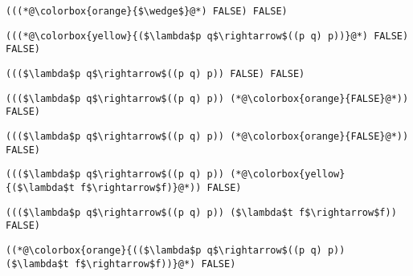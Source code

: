 \documentclass{beamer}
\begin{document}
\begin{frame}[fragile]{\CurrentSection}
\lstset{basicstyle=\ttfamily\small}\lstset{numbers=none}\lstset{language=ML}\begin{lstlisting}
(((*@\colorbox{orange}{$\wedge$}@*) FALSE) FALSE)
\end{lstlisting}
\pause\lstset{language=ML}\begin{lstlisting}
(((*@\colorbox{yellow}{($\lambda$p q$\rightarrow$((p q) p))}@*) FALSE) FALSE)
\end{lstlisting}

\end{frame}

\begin{frame}[fragile]{\CurrentSection}
\lstset{basicstyle=\ttfamily\small}\lstset{numbers=none}\lstset{language=ML}\begin{lstlisting}
((($\lambda$p q$\rightarrow$((p q) p)) FALSE) FALSE)
\end{lstlisting}
\pause\lstset{language=ML}\begin{lstlisting}
((($\lambda$p q$\rightarrow$((p q) p)) (*@\colorbox{orange}{FALSE}@*)) FALSE)
\end{lstlisting}

\end{frame}

\begin{frame}[fragile]{\CurrentSection}
\lstset{basicstyle=\ttfamily\small}\lstset{numbers=none}\lstset{language=ML}\begin{lstlisting}
((($\lambda$p q$\rightarrow$((p q) p)) (*@\colorbox{orange}{FALSE}@*)) FALSE)
\end{lstlisting}
\pause\lstset{language=ML}\begin{lstlisting}
((($\lambda$p q$\rightarrow$((p q) p)) (*@\colorbox{yellow}{($\lambda$t f$\rightarrow$f)}@*)) FALSE)
\end{lstlisting}

\end{frame}

\begin{frame}[fragile]{\CurrentSection}
\lstset{basicstyle=\ttfamily\small}\lstset{numbers=none}\lstset{language=ML}\begin{lstlisting}
((($\lambda$p q$\rightarrow$((p q) p)) ($\lambda$t f$\rightarrow$f)) FALSE)
\end{lstlisting}
\pause\lstset{language=ML}\begin{lstlisting}
((*@\colorbox{orange}{(($\lambda$p q$\rightarrow$((p q) p)) ($\lambda$t f$\rightarrow$f))}@*) FALSE)
\end{lstlisting}

\end{frame}
\end{document}
